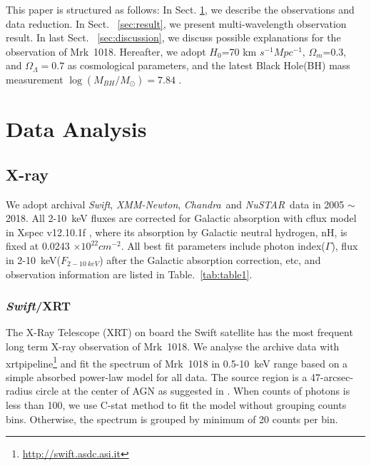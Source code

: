 \documentclass[twocolumn]{aastex63}
\newcommand{\xmm}{{\em XMM-Newton}}
\newcommand{\nustar}{{\em NuSTAR}}
\newcommand{\chandra}{{\em Chandra}}
\newcommand{\swift}{{\em Swift}}
\begin{document}
This paper is structured as follows: In Sect. \ref{sec:data}, we describe the observations and data reduction. In Sect. ~\ref{sec:result}, we present multi-wavelength observation result. In last Sect. ~\ref{sec:discussion}, we discuss possible explanations for the observation of Mrk~1018. Hereafter, we adopt $H_0$=70 km $s^{-1} Mpc^{-1}$, $\Omega_{m}$=0.3, and $\Omega_{\Lambda}=0.7 $ as cosmological parameters, and the latest Black Hole(BH) mass measurement $\log(M_{BH}/M_{\odot})=7.84$ \citep{2017MNRAS.472.3492E,2018MNRAS.480.3898N}. 


\section{Data Analysis}\label{sec:data}
\subsection{X-ray}
We adopt archival \swift, \xmm, \chandra~and \nustar~data in 2005 $\sim$ 2018. All 2-10~keV fluxes are corrected for Galactic absorption with cflux model in Xspec v12.10.1f \citep{1996ASPC..101...17A}, where its absorption by Galactic neutral hydrogen, nH, is fixed at 0.0243 $\times 10^{22} cm^{-2}$\citep[see ][]{2016A&A...593L...9H}. All best fit parameters include photon index($\Gamma$), flux in 2-10~keV($F_{2-10~keV}$) after the Galactic absorption correction, etc, and observation information are listed in Table.~\ref{tab:table1}.


\subsubsection{\swift/XRT}
The X-Ray Telescope (XRT) on board the Swift satellite has the most frequent long term X-ray observation of Mrk~1018. We analyse the archive data with xrtpipeline\footnote{\url{http://swift.asdc.asi.it}} and fit the spectrum of Mrk~1018 in 0.5-10~keV range based on a simple absorbed power-law model for all data.  The source region is a 47-arcsec-radius circle at the center of AGN as suggested in \citet{2009MNRAS.397.1177E}. When counts of photons is less than 100, we use C-stat method to fit the model without grouping counts bins. Otherwise, the spectrum is grouped by minimum of 20 counts per bin. 
\end{document}
